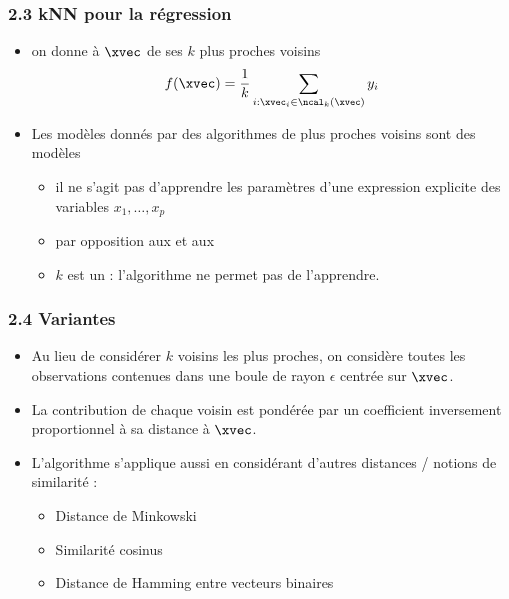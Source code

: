 \begin{frame}
  \frametitle{2.3 kNN pour la régression}
  \begin{itemize}
  \item {} on donne à $\xvec$ 
     de ses $k$ plus proches voisins
    \[ f(\xvec) = \frac1k \sum_{i : \xvec_i \in \ncal_k(\xvec)} y_i \]
  \end{itemize}
  \pause
    \begin{itemize}
    \item {} Les modèles donnés par des algorithmes de plus
      proches voisins sont des modèles 
      \begin{itemize}
      \item il ne s'agit pas d'apprendre les paramètres d'une expression explicite des variables
        $x_1, \dots, x_p$
      \item par opposition aux  et aux 
      \item $k$ est un  : l'algorithme ne permet pas de l'apprendre.
      \end{itemize}
    \end{itemize}
\end{frame}

{
  \begin{frame}
    \frametitle{2.4 Variantes}
    \begin{itemize}
    \item {} Au lieu de considérer $k$ voisins les plus
      proches, on considère toutes les observations contenues dans une boule de
      rayon $\epsilon$ centrée sur $\xvec$.
    \item {} La contribution de chaque voisin est
      pondérée par un coefficient inversement proportionnel à sa distance à
      $\xvec$.
    \item {} L'algorithme s'applique aussi en considérant
      d'autres distances / notions de similarité :
      \begin{itemize}
      \item Distance de Minkowski
      \item Similarité cosinus
      \item Distance de Hamming entre vecteurs binaires
      \end{itemize}
    \end{itemize}
  \end{frame}}




